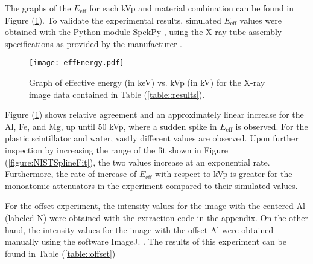 \begin{table}[H]
    \small
    \noindent\makebox[\textwidth]{%
    
    }
    \caption{The results for each non-saturated (intensities not equal to 0 or 1) X-ray image for the composition experiment.}
    \label{table::results}
\end{table}



The graphs of the $E_{\text{eff}}$ for each kVp and material combination can be found in Figure (\ref{figure::results}). To validate the experimental results, simulated $E_{\text{eff}}$ values were obtained with the Python module SpekPy \cite{SpekPy}, using the X-ray tube assembly specifications as provided by the manufacturer \cite{CArm}.


\begin{figure}[H]
    \centering
    \texttt{[image: effEnergy.pdf]}
    \caption{Graph of effective energy (in keV) vs. kVp (in kV) for the X-ray image data contained in Table (\ref{table::results}).}
    \label{figure::results}
\end{figure}

Figure (\ref{figure::results}) shows relative agreement and an approximately linear increase for the Al, Fe, and Mg, up until 50 kVp, where a sudden spike in $E_{\text{eff}}$ is observed. For the plastic scintillator and water, vastly different values are observed. Upon further inspection by increasing the range of the fit shown in Figure (\ref{figure:NISTSplineFit}), the two values increase at an exponential rate. Furthermore, the rate of increase of $E_{\text{eff}}$ with respect to kVp is greater for the monoatomic attenuators in the experiment compared to their simulated values.

For the offset experiment, the intensity values for the image with the centered Al (labeled N) were obtained with the extraction code in the appendix. On the other hand, the intensity values for the image with the offset Al were obtained manually using the software ImageJ. \cite{ImageJ}. The results of this experiment can be found in Table (\ref{table::offset})


\begin{table}[H]
    \small
    \noindent\makebox[\textwidth]{%
    
    }
    \caption{The results of X-ray images of a centered and offset Al (labeled N) at 40 kVp for use in the offset experiment.}
    \label{table::offset}
\end{table}

